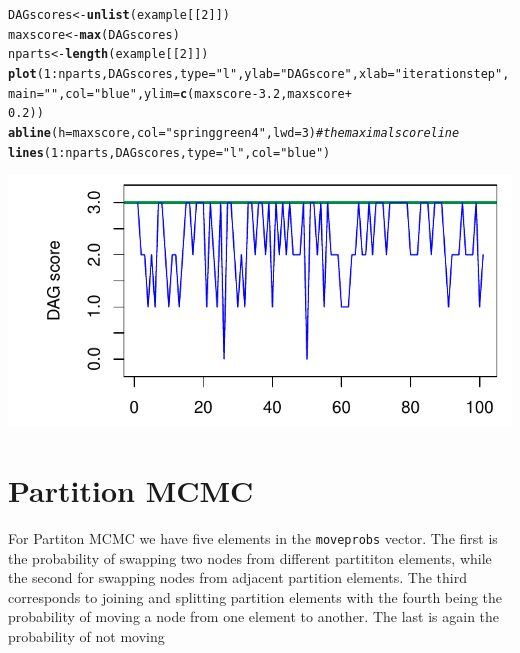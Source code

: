 \documentclass[a4paper]{article}\usepackage[]{graphicx}\usepackage[]{color}
\makeatletter
\def\maxwidth{ %
  \ifdim\Gin@nat@width>\linewidth
    \linewidth
  \else
    \Gin@nat@width
  \fi
}
\newcommand{\hlnum}[1]{\textcolor[rgb]{0.686,0.059,0.569}{#1}}%
\newcommand{\hlstr}[1]{\textcolor[rgb]{0.192,0.494,0.8}{#1}}%
\newcommand{\hlcom}[1]{\textcolor[rgb]{0.678,0.584,0.686}{\textit{#1}}}%
\newcommand{\hlopt}[1]{\textcolor[rgb]{0,0,0}{#1}}%
\newcommand{\hlstd}[1]{\textcolor[rgb]{0.345,0.345,0.345}{#1}}%
\newcommand{\hlkwb}[1]{\textcolor[rgb]{0.69,0.353,0.396}{#1}}%
\newcommand{\hlkwc}[1]{\textcolor[rgb]{0.333,0.667,0.333}{#1}}%
\newcommand{\hlkwd}[1]{\textcolor[rgb]{0.737,0.353,0.396}{\textbf{#1}}}%
\newenvironment{kframe}{%
 \def\at@end@of@kframe{}%
 \ifinner\ifhmode%
  \def\at@end@of@kframe{\end{minipage}}%
  \begin{minipage}{\columnwidth}%
 \fi\fi%
 \def\FrameCommand##1{\hskip\@totalleftmargin \hskip-\fboxsep
 \colorbox{shadecolor}{##1}\hskip-\fboxsep
     \hskip-\linewidth \hskip-\@totalleftmargin \hskip\columnwidth}%
 \MakeFramed {\advance\hsize-\width
   \@totalleftmargin\z@ \linewidth\hsize
   \@setminipage}}%
 {\par\unskip\endMakeFramed%
 \at@end@of@kframe}
\newenvironment{knitrout}{}{} %
\newcommand{\nn}{\noindent}
\makeatother
\begin{document}
\begin{knitrout}
\color{fgcolor}\begin{kframe}
\begin{alltt}
\hlstd{DAGscores} \hlkwb{<-} \hlkwd{unlist}\hlstd{(example[[}\hlnum{2}\hlstd{]])}
\hlstd{maxscore} \hlkwb{<-} \hlkwd{max}\hlstd{(DAGscores)}
\hlstd{nparts} \hlkwb{<-} \hlkwd{length}\hlstd{(example[[}\hlnum{2}\hlstd{]])}
\hlkwd{plot}\hlstd{(}\hlnum{1}\hlopt{:}\hlstd{nparts, DAGscores,} \hlkwc{type} \hlstd{=} \hlstr{"l"}\hlstd{,} \hlkwc{ylab} \hlstd{=} \hlstr{"DAG score"}\hlstd{,} \hlkwc{xlab} \hlstd{=} \hlstr{"iteration step"}\hlstd{,}
    \hlkwc{main} \hlstd{=} \hlstr{""}\hlstd{,} \hlkwc{col} \hlstd{=} \hlstr{"blue"}\hlstd{,} \hlkwc{ylim} \hlstd{=} \hlkwd{c}\hlstd{(maxscore} \hlopt{-} \hlnum{3.2}\hlstd{, maxscore} \hlopt{+}
        \hlnum{0.2}\hlstd{))}
\hlkwd{abline}\hlstd{(}\hlkwc{h} \hlstd{= maxscore,} \hlkwc{col} \hlstd{=} \hlstr{"springgreen4"}\hlstd{,} \hlkwc{lwd} \hlstd{=} \hlnum{3}\hlstd{)}  \hlcom{# the maximal score line}
\hlkwd{lines}\hlstd{(}\hlnum{1}\hlopt{:}\hlstd{nparts, DAGscores,} \hlkwc{type} \hlstd{=} \hlstr{"l"}\hlstd{,} \hlkwc{col} \hlstd{=} \hlstr{"blue"}\hlstd{)}
\end{alltt}
\end{kframe}

{\centering \includegraphics[width=\maxwidth]{figure/minimal-unnamed-chunk-17-1} 

}



\end{knitrout}

\section{Partition MCMC}

\nn For Partiton MCMC we have five elements in the \texttt{moveprobs} vector.  The first is the probability of swapping two nodes from different partititon elements, while the second for swapping nodes from adjacent partition elements.  The third corresponds to joining and splitting partition elements with the fourth being the probability of moving a node from one element to another.  The last is again the probability of not moving
\end{document}
